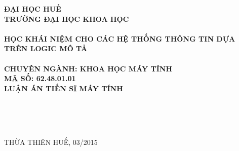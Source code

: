 \cleardoublepage
\begin{titlepage}

\begin{center}
\vspace{-1.0cm}
\textsc{\textbf{ĐẠI HỌC HUẾ}}\\[0.0cm]
{\textbf{TRƯỜNG ĐẠI HỌC KHOA HỌC}}\\[4.0cm]

\textsc{\textbf{ }}\\[2.5cm]

{\fontsize{15}{15} \bfseries HỌC KHÁI NIỆM CHO CÁC HỆ THỐNG THÔNG TIN DỰA TRÊN LOGIC MÔ TẢ}\\[-0.1cm]
~\\[1.5cm]

\textbf{CHUYÊN NGÀNH: KHOA HỌC MÁY TÍNH}\\
\textbf{MÃ SỐ: 62.48.01.01}\\[1.5cm]

\textsc{\large \textbf{LUẬN ÁN TIẾN SĨ MÁY TÍNH}}\\[2.0cm]

\begin{minipage}{0.45\textwidth}
\begin{flushleft}

\end{flushleft}
\end{minipage}
\begin{minipage}{0.50\textwidth}
\begin{flushleft}
{\bf ~} \\
{~ }\\
{~ }
\end{flushleft}
\end{minipage}

\vfill
THỪA THIÊN HUẾ, 03/2015
\vspace{-0.7cm}
\end{center}
\end{titlepage}
\cleardoublepage
